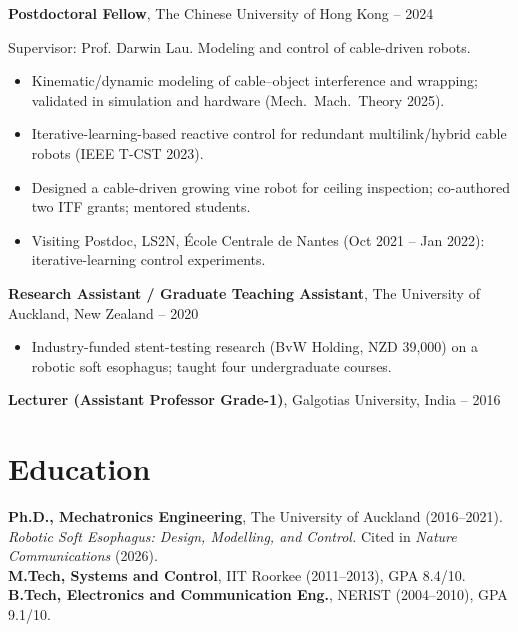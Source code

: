 \documentclass[10pt,a4paper]{article}
\newcommand{\job}[3]{\vspace{0.35em}\textbf{#1}, #2 \hfill {\small\sffamily #3}\par}
\begin{document}
\job{Postdoctoral Fellow}{The Chinese University of Hong Kong}{2021 -- 2024}
Supervisor: Prof. Darwin Lau. Modeling and control of cable-driven robots.
\begin{itemize}
  \item Kinematic/dynamic modeling of cable--object interference and wrapping; validated in simulation and hardware (Mech.\ Mach.\ Theory 2025).
  \item Iterative-learning-based reactive control for redundant multilink/hybrid cable robots (IEEE T-CST 2023).
  \item Designed a cable-driven growing vine robot for ceiling inspection; co-authored two ITF grants; mentored students.
  \item Visiting Postdoc, LS2N, \'Ecole Centrale de Nantes (Oct 2021 -- Jan 2022): iterative-learning control experiments.
\end{itemize}

\job{Research Assistant / Graduate Teaching Assistant}{The University of Auckland, New Zealand}{2017 -- 2020}
\begin{itemize}
  \item Industry-funded stent-testing research (BvW Holding, NZD 39,000) on a robotic soft esophagus; taught four undergraduate courses.
\end{itemize}

\job{Lecturer (Assistant Professor Grade-1)}{Galgotias University, India}{2013 -- 2016}

\section*{Education}
\textbf{Ph.D., Mechatronics Engineering}, The University of Auckland (2016--2021).
\textit{Robotic Soft Esophagus: Design, Modelling, and Control.} Cited in \textit{Nature Communications} (2026).\\
\textbf{M.Tech, Systems and Control}, IIT Roorkee (2011--2013), GPA 8.4/10. \quad
\textbf{B.Tech, Electronics and Communication Eng.}, NERIST (2004--2010), GPA 9.1/10.
\end{document}
